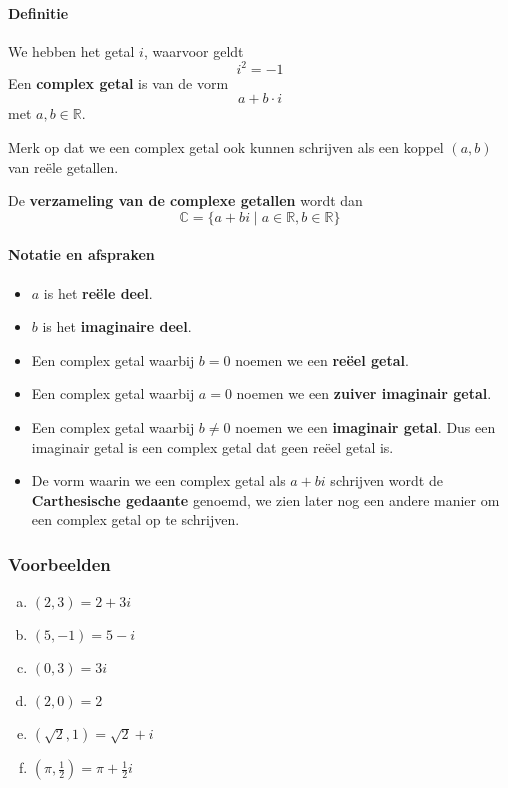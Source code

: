 \documentclass[12pt,twoside,a4paper]{article}
\begin{document}
\paragraph*{Definitie}
\begin{mdframed}
We hebben het getal $i$, waarvoor geldt
$$i^2=-1$$
Een {\bf complex getal} is van de vorm
$$a+b\cdot i$$
met $a,b \in \mathbb{R}$.
\end{mdframed}

Merk op dat we een complex getal ook kunnen schrijven als een koppel $(a,b)$ van reële getallen.

De {\bf verzameling van de complexe getallen} wordt dan
$$\mathbb{C}=\{ a + bi \;|\; a\in\mathbb{R}, b\in\mathbb{R}\}$$

\paragraph*{Notatie en afspraken}
\begin{itemize}
  \item $a$ is het {\bf reële deel}.
  \item $b$ is het {\bf imaginaire deel}.
  \item Een complex getal waarbij $b=0$ noemen we een {\bf reëel getal}.
  \item Een complex getal waarbij $a=0$ noemen we een {\bf zuiver imaginair getal}.
  \item Een complex getal waarbij $b\neq 0$ noemen we een {\bf imaginair getal}. Dus een imaginair getal is een complex getal dat geen reëel getal is.
  \item De vorm waarin we een complex getal als $a+bi$ schrijven wordt de {\bf Carthesische gedaante} genoemd, we zien later nog een andere manier om een complex getal op te schrijven.
\end{itemize}

\subsubsection*{Voorbeelden}

\begin{multicols}{2}
\begin{enumerate}[(a)]
  \item $(2,3)=2+3i$
  \item $(5,-1)=5-i$
  \item $(0,3)=3i$
  \item $(2,0)=2$
  \item $(\sqrt{2},1)=\sqrt{2}+i$
  \item $(\pi, \frac{1}{2})=\pi+\frac{1}{2}i$
\end{enumerate}
\end{multicols}
\end{document}
